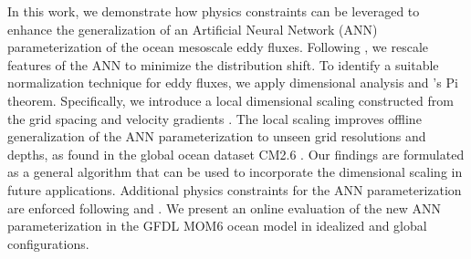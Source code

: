 \documentclass[draft]{agujournal2019}
\providecommand{\DIFdelbegin}{} %
\begin{document}
In this work, we demonstrate how physics constraints can be leveraged to enhance the generalization of an Artificial Neural Network (ANN) parameterization of the ocean mesoscale eddy fluxes. Following , we rescale features of the ANN to minimize the distribution shift. To identify a suitable normalization technique for eddy fluxes, we apply dimensional analysis and 's Pi theorem. Specifically, we introduce a local dimensional scaling constructed from the grid spacing and velocity gradients \cite{prakash2022invariant}. The local scaling improves offline generalization of the ANN parameterization to unseen grid resolutions and depths, as found in the global ocean dataset CM2.6 \cite{griffies2015impacts}. Our findings are formulated as a general algorithm that can be used to incorporate the dimensional scaling in future applications. Additional physics constraints for the ANN parameterization are enforced following  and . %
We present an online evaluation of the new ANN parameterization in the GFDL MOM6 ocean model \cite{adcroft2019gfdl} in idealized and global configurations.


\DIFdelbegin %
\end{document}
